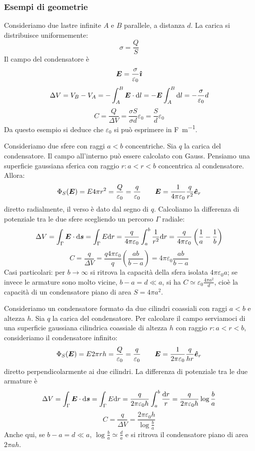 \subsubsection{Esempi di geometrie}
\begin{Es}[piano]
  Consideriamo due lastre infinite $A$ e $B$ parallele, a distanza $d$. La carica si distribuisce uniformemente:
  \[\sigma=\frac{Q}{S}\]
  Il campo del condensatore è
  \[\boldsymbol{E}=\frac{\sigma}{\varepsilon_0}\boldsymbol{\hat {\imath}}\]
  \[\Delta V=V_B-V_A=-\int_A^B\boldsymbol{E}\cdot\mathrm{d} l=-\boldsymbol{E}\int_A^B\mathrm{d} l=-\frac{\sigma}{\varepsilon_0}d\]
  \[C=\frac{Q}{\Delta V}=\frac{\sigma S}{\sigma d}\varepsilon_0=\frac{S}{d}\varepsilon_0\]
  Da questo esempio si deduce che $\varepsilon_0$ si può esprimere in \si{\farad\per\meter}.
\end{Es}
\begin{Es}[sferico]
  Consideriamo due sfere con raggi $a<b$ concentriche. Sia $q$ la carica del condensatore. Il campo all'interno può essere calcolato con Gauss. Pensiamo una superficie gaussiana sferica con raggio $r:a<r<b$ concentrica al condensatore. Allora:
  \[\Phi_S(\boldsymbol{E})=E 4\pi r^2=\frac{Q}{\varepsilon_0}=\frac{q}{\varepsilon_0}\qquad \boldsymbol{E}=\frac{1}{4\pi\varepsilon_0}\frac{q}{r^2}\boldsymbol{\hat {e}}_r\]
  diretto radialmente, il verso è dato dal segno di $q$. Calcoliamo la differenza di potenziale tra le due sfere scegliendo un percorso $\Gamma$ radiale:
  \[\Delta V=\int_\Gamma\boldsymbol{E}\cdot\mathrm{d}\boldsymbol{s}=\int_\Gamma E\mathrm{d} r=\frac{q}{4\pi\varepsilon_0}\int_a^b\frac{1}{r^2}\mathrm{d} r=\frac{q}{4\pi\varepsilon_0}\left(\frac{1}{a}-\frac{1}{b}\right)\]
  \[C=\frac{q}{\Delta V}=\frac{q4\pi\varepsilon_0}{q}\left(\frac{ab}{b-a}\right)=4\pi\varepsilon_0\frac{ab}{b-a}\]
  Casi particolari: per $b\to\infty$ si ritrova la capacità della sfera isolata $4\pi\varepsilon_0a$; se invece le armature sono molto vicine, $b-a=d\ll a$, si ha $C\simeq\varepsilon_0\frac{4\pi a^2}{d}$, cioè la capacità di un condensatore piano di area $S=4\pi a^2$.
\end{Es}
\begin{Es}[cilindrico]
  Consideriamo un condensatore formato da due cilindri coassiali con raggi $a<b$ e altezza $h$. Sia $q$ la carica del condensatore. Per calcolare il campo serviamoci di una superficie gaussiana cilindrica coassiale di altezza $h$ con raggio $r:a<r<b$, consideriamo il condensatore infinito:
  \[\Phi_S(\boldsymbol{E})=E2\pi rh=\frac{Q}{\varepsilon_0}=\frac{q}{\varepsilon_0}\qquad \boldsymbol{E}=\frac{1}{2\pi\varepsilon_0}\frac{q}{hr}\boldsymbol{\hat {e}}_r\]
  diretto perpendicolarmente ai due cilindri. La differenza di potenziale tra le due armature è
  \[\Delta V=\int_\Gamma\boldsymbol{E}\cdot\mathrm{d}\boldsymbol{s}=\int_\Gamma E\mathrm{d} r=\frac{q}{2\pi\varepsilon_0h}\int_a^b\frac{\mathrm{d} r}{r}=\frac{q}{2\pi\varepsilon_0h}\log\frac{b}{a}\]
  \[C=\frac{q}{\Delta V}=\frac{2\pi\varepsilon_0h}{\log\frac{b}{a}}\]
  Anche qui, se $b-a=d\ll a$, $\log\frac{b}{a}\simeq\frac{d}{a}$ e si ritrova il condensatore piano di area $2\pi ah$.
\end{Es}
